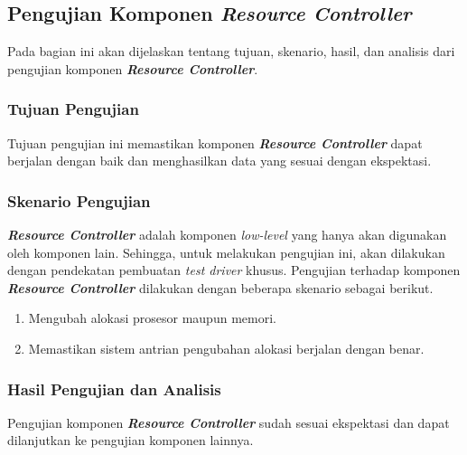 \subsection{Pengujian Komponen \textit{Resource Controller}}

Pada bagian ini akan dijelaskan tentang tujuan, skenario, hasil, dan analisis dari pengujian komponen \textbf{\textit{Resource Controller}}.

\subsubsection{Tujuan Pengujian}

Tujuan pengujian ini memastikan komponen \textbf{\textit{Resource Controller}} dapat berjalan dengan baik dan menghasilkan data yang sesuai dengan ekspektasi.

\subsubsection{Skenario Pengujian}

\textbf{\textit{Resource Controller}} adalah komponen \textit{low-level} yang hanya akan digunakan oleh komponen lain. Sehingga, untuk melakukan pengujian ini, akan dilakukan dengan pendekatan pembuatan \textit{test driver} khusus. Pengujian terhadap komponen \textbf{\textit{Resource Controller}} dilakukan dengan beberapa skenario sebagai berikut.
\begin{enumerate}
    \item Mengubah alokasi prosesor maupun memori.
    \item Memastikan sistem antrian pengubahan alokasi berjalan dengan benar.
\end{enumerate}

\subsubsection{Hasil Pengujian dan Analisis}


Pengujian komponen \textbf{\textit{Resource Controller}} sudah sesuai ekspektasi dan dapat dilanjutkan ke pengujian komponen lainnya.
